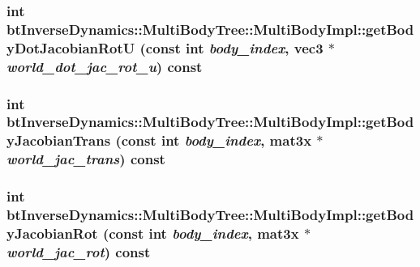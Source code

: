  \hypertarget{classbt_inverse_dynamics_1_1_multi_body_tree_1_1_multi_body_impl_dd377929159d3005cb80eb694ebed57e}{
\subsubsection[getBodyDotJacobianRotU]{\setlength{\rightskip}{0pt plus 5cm}int btInverseDynamics::MultiBodyTree::MultiBodyImpl::getBodyDotJacobianRotU (const int {\em body\_\-index}, \/  {\bf vec3} $\ast$ {\em world\_\-dot\_\-jac\_\-rot\_\-u}) const}}
\label{classbt_inverse_dynamics_1_1_multi_body_tree_1_1_multi_body_impl_dd377929159d3005cb80eb694ebed57e}


 \hypertarget{classbt_inverse_dynamics_1_1_multi_body_tree_1_1_multi_body_impl_de8deee754a4e09bd652920a4e63875c}{
\subsubsection[getBodyJacobianTrans]{\setlength{\rightskip}{0pt plus 5cm}int btInverseDynamics::MultiBodyTree::MultiBodyImpl::getBodyJacobianTrans (const int {\em body\_\-index}, \/  mat3x $\ast$ {\em world\_\-jac\_\-trans}) const}}
\label{classbt_inverse_dynamics_1_1_multi_body_tree_1_1_multi_body_impl_de8deee754a4e09bd652920a4e63875c}


 \hypertarget{classbt_inverse_dynamics_1_1_multi_body_tree_1_1_multi_body_impl_6ad506d2cc78d6184decd005bdabdce7}{
\subsubsection[getBodyJacobianRot]{\setlength{\rightskip}{0pt plus 5cm}int btInverseDynamics::MultiBodyTree::MultiBodyImpl::getBodyJacobianRot (const int {\em body\_\-index}, \/  mat3x $\ast$ {\em world\_\-jac\_\-rot}) const}}
\label{classbt_inverse_dynamics_1_1_multi_body_tree_1_1_multi_body_impl_6ad506d2cc78d6184decd005bdabdce7}


